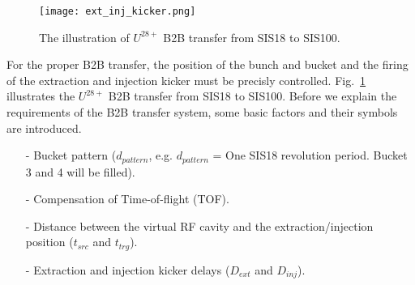
\begin{figure}[!htb]
   \centering   
   \texttt{[image: ext\_inj\_kicker.png]}
   \caption{The illustration of $U^{28+}$ B2B transfer from SIS18 to SIS100.}
   \label{ext_inj_kicker}
\end{figure}

For the proper B2B transfer, the position of the bunch and bucket and the firing of the extraction and injection kicker must be precisly controlled. Fig.~\ref{ext_inj_kicker} illustrates the $U^{28+}$ B2B transfer from SIS18 to SIS100. Before we explain the requirements of the B2B transfer system, some basic factors and their symbols are introduced.

\begin{itemize}
\item[-] Bucket pattern ($d_{pattern}$, e.g. $d_{pattern}$ = One SIS18 revolution period. Bucket 3 and 4 will be filled).
\item[-] Compensation of Time-of-flight (\gls{TOF}). 
\item[-] Distance between the virtual RF cavity and the extraction/injection position  ($t_{src}$ and $t_{trg}$). 
\item[-] Extraction and injection kicker delays ($D_{ext}$ and $D_{inj}$).
\end{itemize}

